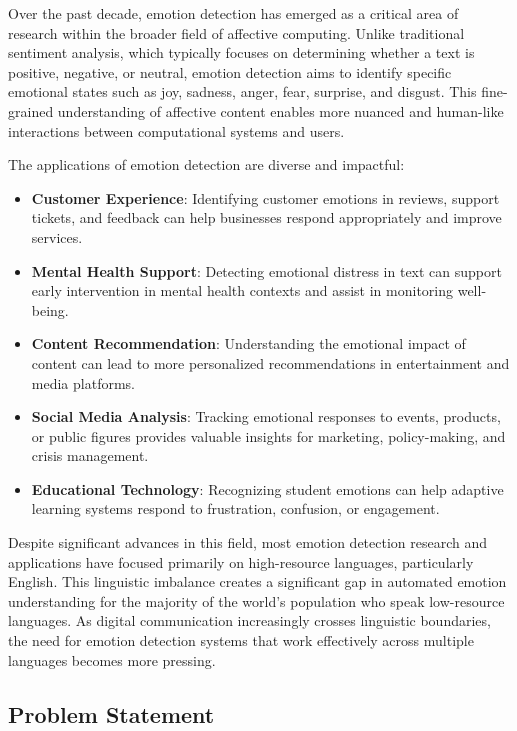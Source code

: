 \documentclass[a4paper,12pt]{extarticle}
\begin{document}
Over the past decade, emotion detection has emerged as a critical area of research within the broader field of affective computing. Unlike traditional sentiment analysis, which typically focuses on determining whether a text is positive, negative, or neutral, emotion detection aims to identify specific emotional states such as joy, sadness, anger, fear, surprise, and disgust. This fine-grained understanding of affective content enables more nuanced and human-like interactions between computational systems and users.

The applications of emotion detection are diverse and impactful:

\begin{itemize}
\item \textbf{Customer Experience}: Identifying customer emotions in reviews, support tickets, and feedback can help businesses respond appropriately and improve services.
\item \textbf{Mental Health Support}: Detecting emotional distress in text can support early intervention in mental health contexts and assist in monitoring well-being.
\item \textbf{Content Recommendation}: Understanding the emotional impact of content can lead to more personalized recommendations in entertainment and media platforms.
\item \textbf{Social Media Analysis}: Tracking emotional responses to events, products, or public figures provides valuable insights for marketing, policy-making, and crisis management.
\item \textbf{Educational Technology}: Recognizing student emotions can help adaptive learning systems respond to frustration, confusion, or engagement.
\end{itemize}

Despite significant advances in this field, most emotion detection research and applications have focused primarily on high-resource languages, particularly English. This linguistic imbalance creates a significant gap in automated emotion understanding for the majority of the world's population who speak low-resource languages. As digital communication increasingly crosses linguistic boundaries, the need for emotion detection systems that work effectively across multiple languages becomes more pressing.

\subsection{Problem Statement}
\end{document}

